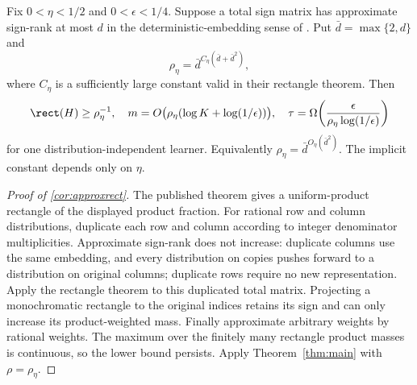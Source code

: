 \begin{corollary}\label{cor:approxrect}
Fix $0<\eta<1/2$ and $0<\epsilon<1/4$. Suppose a total sign matrix has approximate sign-rank at most $d$ in the deterministic-embedding sense of \citet{BHKR26}. Put $\bar d=\max\{2,d\}$ and
\[
 \rho_\eta=\bar d^{C_\eta(\bar d+\bar d^2)},
\]
where $C_\eta$ is a sufficiently large constant valid in their rectangle theorem. Then
\[
 \rect(H)\ge\rho_\eta^{-1},\quad
 m=O\bigl(\rho_\eta(\log K+\log(1/\epsilon))\bigr),\quad
 \tau=\Omega\!\left(\frac{\epsilon}{\rho_\eta\log(1/\epsilon)}\right)
\]
for one distribution-independent learner. Equivalently $\rho_\eta=\bar d^{O_\eta(\bar d^2)}$. The implicit constant depends only on $\eta$.
\end{corollary}

\begin{proof}[Proof of \cref{cor:approxrect}]
The published theorem gives a uniform-product rectangle of the displayed product fraction. For rational row and column distributions, duplicate each row and column according to integer denominator multiplicities. Approximate sign-rank does not increase: duplicate columns use the same embedding, and every distribution on copies pushes forward to a distribution on original columns; duplicate rows require no new representation. Apply the rectangle theorem to this duplicated total matrix. Projecting a monochromatic rectangle to the original indices retains its sign and can only increase its product-weighted mass. Finally approximate arbitrary weights by rational weights. The maximum over the finitely many rectangle product masses is continuous, so the lower bound persists. Apply Theorem~\ref{thm:main} with $\rho=\rho_\eta$.
\end{proof}
